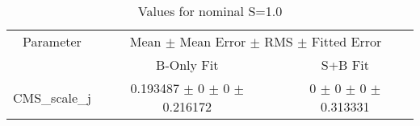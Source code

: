 \begin{table}
\centering
\caption{Values for nominal S=1.0}
\begin{tabular}{ccc}
\toprule
Parameter 	& \multicolumn{2}{c}{Mean $\pm$ Mean Error $\pm$ RMS $\pm$ Fitted Error}\\
 	& B-Only Fit & S+B Fit\\
\midrule
CMS\_scale\_j 	& \num{0.193487} $\pm$ \num{0} $\pm$ \num{0} $\pm$ \num{0.216172} 	& \num{0} $\pm$ \num{0} $\pm$ \num{0} $\pm$ \num{0.313331}\\
\bottomrule
\end{tabular}
\end{table}
